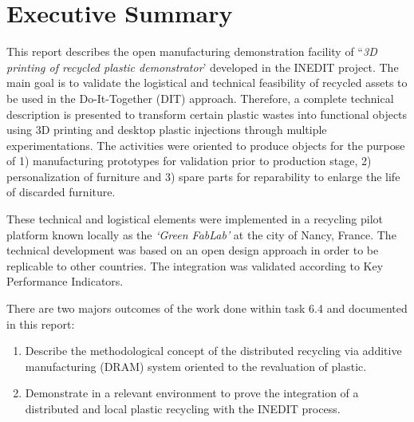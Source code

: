 \documentclass[
  11pt,
]{article}
\providecommand{\tightlist}{%
  \setlength{\itemsep}{0pt}\setlength{\parskip}{0pt}}\usepackage{longtable,booktabs,array}
\renewcommand*\contentsname{Table of contents}
\newcommand\contentsname{Table of contents}
\begin{document}
\vfill
\newpage

\ifdefined\Shaded\renewenvironment{Shaded}{\begin{tcolorbox}[interior hidden, enhanced, boxrule=0pt, sharp corners, frame hidden, borderline west={3pt}{0pt}{shadecolor}, breakable]}{\end{tcolorbox}}\fi

\renewcommand*\contentsname{Table of contents}
{
\hypersetup{linkcolor=}
\setcounter{tocdepth}{3}
\tableofcontents
}
\newpage

\bgroup
\hypersetup{linkcolor = black}
\listoffigures
\egroup

\color{darkgray}

\newpage

\hypertarget{executive-summary}{%
\section{Executive Summary}\label{executive-summary}}

This report describes the open manufacturing demonstration facility of
``\emph{3D printing of recycled plastic demonstrator}' developed in the
INEDIT project. The main goal is to validate the logistical and
technical feasibility of recycled assets to be used in the
Do-It-Together (DIT) approach. Therefore, a complete technical
description is presented to transform certain plastic wastes into
functional objects using 3D printing and desktop plastic injections
through multiple experimentations. The activities were oriented to
produce objects for the purpose of 1) manufacturing prototypes for
validation prior to production stage, 2) personalization of furniture
and 3) spare parts for reparability to enlarge the life of discarded
furniture.

These technical and logistical elements were implemented in a recycling
pilot platform known locally as the \emph{`Green FabLab'} at the city of
Nancy, France. The technical development was based on an open design
approach in order to be replicable to other countries. The integration
was validated according to Key Performance Indicators.

There are two majors outcomes of the work done within task 6.4 and
documented in this report:

\begin{enumerate}
\def\labelenumi{\arabic{enumi}.}
\tightlist
\item
  Describe the methodological concept of the distributed recycling via
  additive manufacturing (DRAM) system oriented to the revaluation of
  plastic.
\item
  Demonstrate in a relevant environment to prove the integration of a
  distributed and local plastic recycling with the INEDIT process.
\end{enumerate}
\end{document}
